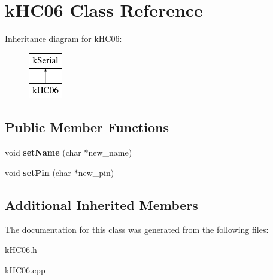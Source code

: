 \hypertarget{classkHC06}{}\section{k\+H\+C06 Class Reference}
\label{classkHC06}
Inheritance diagram for k\+H\+C06\+:\begin{figure}[H]
\begin{center}
\leavevmode
\includegraphics[height=2.000000cm]{classkHC06}
\end{center}
\end{figure}
\subsection*{Public Member Functions}
\begin{DoxyCompactItemize}
\item 
void {\bfseries set\+Name} (char $\ast$new\+\_\+name)\hypertarget{classkHC06_a20f05bfb561fd344bc9230cecba6d697}{}\label{classkHC06_a20f05bfb561fd344bc9230cecba6d697}

\item 
void {\bfseries set\+Pin} (char $\ast$new\+\_\+pin)\hypertarget{classkHC06_ae9d47c685c1130ef68c79573880183b2}{}\label{classkHC06_ae9d47c685c1130ef68c79573880183b2}

\end{DoxyCompactItemize}
\subsection*{Additional Inherited Members}


The documentation for this class was generated from the following files\+:\begin{DoxyCompactItemize}
\item 
k\+H\+C06.\+h\item 
k\+H\+C06.\+cpp\end{DoxyCompactItemize}
